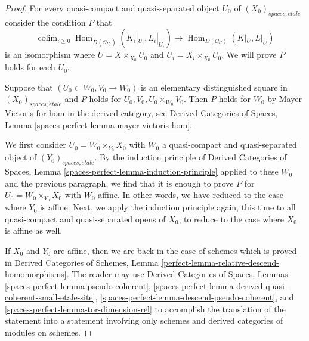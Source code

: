 \documentclass[10pt,a4paper]{amsart}
\theoremstyle{plain}
\theoremstyle{definition}
\theoremstyle{remark}
\numberwithin{equation}{subsection}
\def\colim{\mathop{\mathrm{colim}}\nolimits}
\def\Hom{\mathop{\mathrm{Hom}}\nolimits}
\def\etale{{\acute{e}tale}}
\begin{document}
\begin{proof}
For every quasi-compact and quasi-separated object $U_0$ of
$(X_0)_{spaces, \etale}$ consider the condition $P$ that
$$
\colim_{i \geq 0} \Hom_{D(\mathcal{O}_{U_i})}(K_i|_{U_i}, L_i|_{U_i})
\longrightarrow
\Hom_{D(\mathcal{O}_U)}(K|_U, L|_U)
$$
is an isomorphism where $U = X \times_{X_0} U_0$ and
$U_i = X_i \times_{X_0} U_0$. We will prove $P$ holds for each $U_0$.

\medskip\noindent
Suppose that $(U_0 \subset W_0, V_0 \to W_0)$ is an elementary
distinguished square in $(X_0)_{spaces, \etale}$
and $P$ holds for $U_0, V_0, U_0 \times_{W_0} V_0$.
Then $P$ holds for $W_0$ by Mayer-Vietoris
for hom in the derived category, see Derived Categories of Spaces,
Lemma \ref{spaces-perfect-lemma-mayer-vietoris-hom}.

\medskip\noindent
We first consider $U_0 = W_0 \times_{Y_0} X_0$ with $W_0$ a
quasi-compact and quasi-separated object of $(Y_0)_{spaces, \etale}$.
By the induction principle of Derived Categories of Spaces,
Lemma \ref{spaces-perfect-lemma-induction-principle}
applied to these $W_0$ and the previous paragraph,
we find that it is enough to prove
$P$ for $U_0 = W_0 \times_{Y_0} X_0$ with $W_0$ affine.
In other words, we have reduced to the case where $Y_0$ is affine.
Next, we apply the induction principle again, this time to all
quasi-compact and quasi-separated opens of $X_0$, to reduce to the
case where $X_0$ is affine as well.

\medskip\noindent
If $X_0$ and $Y_0$ are affine, then we are back in the case
of schemes which is proved in
Derived Categories of Schemes, Lemma
\ref{perfect-lemma-relative-descend-homomorphisms}.
The reader may use
Derived Categories of Spaces, Lemmas
\ref{spaces-perfect-lemma-pseudo-coherent},
\ref{spaces-perfect-lemma-derived-quasi-coherent-small-etale-site},
\ref{spaces-perfect-lemma-descend-pseudo-coherent}, and
\ref{spaces-perfect-lemma-tor-dimension-rel}
to accomplish the translation of the statement into a statement
involving only schemes and derived categories of modules on schemes.
\end{proof}
\end{document}
